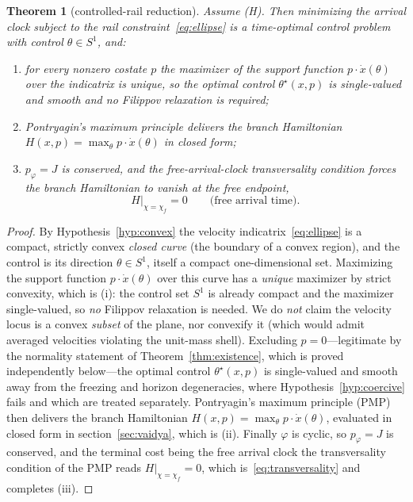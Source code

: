 \documentclass[12pt]{iopart}
\theoremstyle{plain}
\newtheorem{theorem}{Theorem}
\theoremstyle{definition}
\theoremstyle{plain}
\theoremstyle{remark}
\newcommand{\Ithm}[1]{\setcounter{theorem}{\numexpr#1-1\relax}}
\begin{document}
\Ithm{1}
\begin{theorem}[controlled-rail reduction]\label{thm:rail}
Assume (H). Then minimizing the arrival clock subject to the rail
constraint~\eqref{eq:ellipse} is a time-optimal control problem with control
$\theta\in S^1$, and:
\begin{enumerate}
\item[(i)] for every nonzero costate $p$ the maximizer of the support function
$p\cdot\dot x(\theta)$ over the indicatrix is unique, so the optimal control
$\theta^\star(x,p)$ is single-valued and smooth and no Filippov relaxation is required;
\item[(ii)] Pontryagin's maximum principle delivers the branch Hamiltonian
$H(x,p)=\max_\theta p\cdot\dot x(\theta)$ in closed form;
\item[(iii)] $p_\varphi=J$ is conserved, and the free-arrival-clock transversality
condition forces the branch Hamiltonian to vanish at the free endpoint,
\begin{equation}
    H\big|_{\chi=\chi_f}=0 \qquad\text{(free arrival time).}
    \label{eq:transversality}
\end{equation}
\end{enumerate}
\end{theorem}

\begin{proof}
By Hypothesis~\ref{hyp:convex} the velocity indicatrix~\eqref{eq:ellipse} is a compact,
strictly convex \emph{closed curve} (the boundary of a convex region), and the control is
its direction $\theta\in S^1$, itself a compact one-dimensional set. Maximizing the
support function $p\cdot\dot x(\theta)$ over this curve has a \emph{unique} maximizer by
strict convexity, which is (i): the control set $S^1$ is already compact and the maximizer
single-valued, so \emph{no} Filippov relaxation is needed. We do \emph{not} claim the
velocity locus is a convex \emph{subset} of the plane, nor convexify it (which would admit
averaged velocities violating the unit-mass shell). Excluding $p=0$---legitimate by the
normality statement of Theorem~\ref{thm:existence}, which is proved independently
below---the optimal control $\theta^\star(x,p)$ is single-valued and smooth away from the
freezing and horizon degeneracies, where Hypothesis~\ref{hyp:coercive} fails and which are
treated separately. Pontryagin's maximum principle (PMP) \cite{Pontryagin,Liberzon} then
delivers the branch Hamiltonian $H(x,p)=\max_\theta p\cdot\dot x(\theta)$, evaluated in
closed form in section~\ref{sec:vaidya}, which is (ii). Finally $\varphi$ is cyclic, so
$p_\varphi=J$ is conserved, and the terminal cost being the free arrival clock the
transversality condition of the PMP reads $H|_{\chi=\chi_f}=0$, which
is~\eqref{eq:transversality} and completes (iii).
\end{proof}
\end{document}
